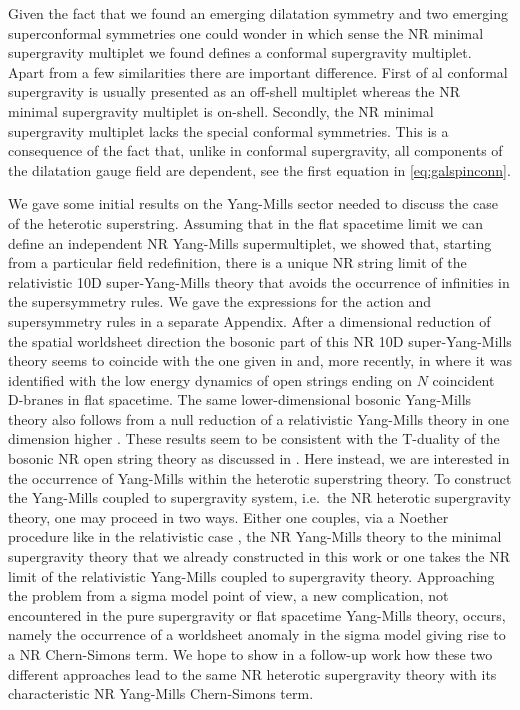 \documentclass[a4paper,10pt,openany]{article}
\begin{document}
	Given the fact that we found an emerging dilatation symmetry and two emerging superconformal symmetries one could wonder in which sense the NR minimal supergravity multiplet we found defines a conformal supergravity multiplet. Apart from a few similarities there are  important difference. First of al conformal supergravity is usually presented as an off-shell multiplet whereas the NR minimal supergravity multiplet is on-shell. Secondly, the NR minimal supergravity multiplet lacks the special conformal symmetries. This is a consequence of the fact that, unlike in conformal supergravity, all  components of the dilatation gauge field are dependent, see the first equation in \eqref{eq:galspinconn}.
	
	
	We gave some initial results on the Yang-Mills sector needed to discuss the case of the heterotic superstring. Assuming that in the flat spacetime limit we can define an independent NR Yang-Mills supermultiplet, we showed that, starting from  a particular field redefinition, there is a unique NR string limit of the relativistic 10D super-Yang-Mills theory that avoids the occurrence of infinities in the supersymmetry rules. We gave the expressions for the action and supersymmetry rules in a separate Appendix.  After a dimensional  reduction of the spatial worldsheet direction the bosonic part of this NR 10D  super-Yang-Mills theory seems to coincide with the one given in \cite{Santos:2004pq,Bergshoeff:2015sic} and, more recently, in \cite{Gomis:2020fui} where it was identified with
	the low energy dynamics of open strings ending on $N$ coincident D-branes in flat spacetime. The same lower-dimensional bosonic Yang-Mills theory also follows from
	a null reduction of a relativistic Yang-Mills theory in one dimension higher \cite{Festuccia:2016caf}. These results seem to be consistent with the T-duality of the bosonic NR open string theory as discussed in \cite{Gomis:2020izd}. Here instead, we are interested in the occurrence of Yang-Mills within the heterotic superstring theory. To construct the Yang-Mills coupled to supergravity system, i.e.~the NR heterotic supergravity theory, one may proceed in two ways. Either one couples, via a Noether procedure like in the relativistic case \cite{Bergshoeff:1981um}, the NR Yang-Mills theory to the minimal supergravity theory that we already constructed in this work or one takes the NR limit of the relativistic Yang-Mills coupled to supergravity theory. Approaching the problem from a sigma model point of view, a new complication, not encountered in the pure supergravity or flat spacetime Yang-Mills theory, occurs, namely  the occurrence of a  worldsheet anomaly in the  sigma model giving rise to a NR Chern-Simons term. We hope to show in a follow-up work how these two  different approaches lead to the same NR heterotic supergravity theory with its characteristic NR Yang-Mills Chern-Simons term.
	
\end{document}
